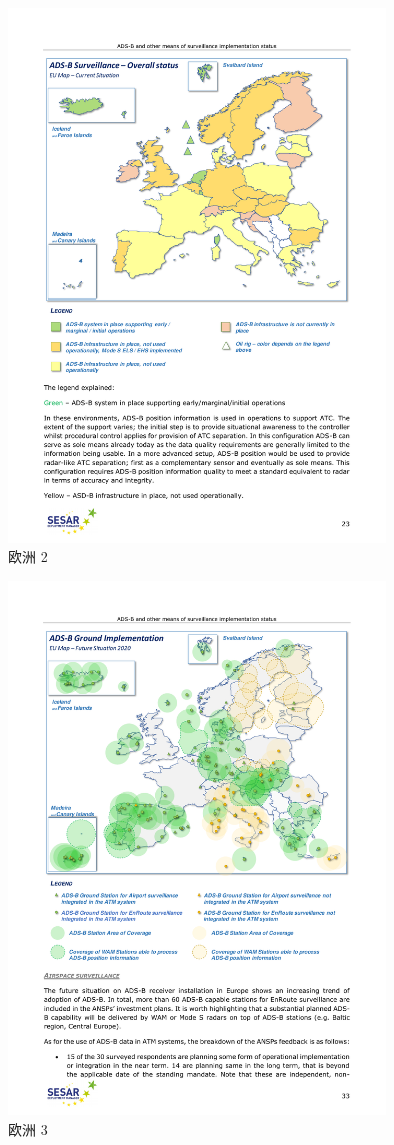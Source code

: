\begin{figure}[htbp]
\centering
\includegraphics[width=10cm]{pic/20180515-sesar-ads-b-report_23.pdf}
\caption{欧洲 2}
\label{fig:20180515-sesar-ads-b-report_23}
\end{figure}

\begin{figure}[htbp]
\centering
\includegraphics[width=10cm]{pic/20180515-sesar-ads-b-report_33.pdf}
\caption{欧洲 3}
\label{fig:20180515-sesar-ads-b-report_33}
\end{figure}

